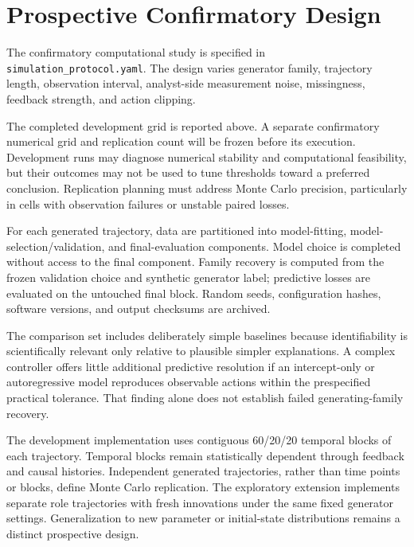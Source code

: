 \section{Prospective Confirmatory Design}

The confirmatory computational study is specified in \texttt{simulation\_protocol.yaml}. The design varies generator family, trajectory length, observation interval, analyst-side measurement noise, missingness, feedback strength, and action clipping.

The completed development grid is reported above. A separate confirmatory numerical grid and replication count will be frozen before its execution. Development runs may diagnose numerical stability and computational feasibility, but their outcomes may not be used to tune thresholds toward a preferred conclusion. Replication planning must address Monte Carlo precision, particularly in cells with observation failures or unstable paired losses.

For each generated trajectory, data are partitioned into model-fitting, model-selection/validation, and final-evaluation components. Model choice is completed without access to the final component. Family recovery is computed from the frozen validation choice and synthetic generator label; predictive losses are evaluated on the untouched final block. Random seeds, configuration hashes, software versions, and output checksums are archived.

The comparison set includes deliberately simple baselines because identifiability is scientifically relevant only relative to plausible simpler explanations. A complex controller offers little additional predictive resolution if an intercept-only or autoregressive model reproduces observable actions within the prespecified practical tolerance. That finding alone does not establish failed generating-family recovery.

The development implementation uses contiguous 60/20/20 temporal blocks of each trajectory. Temporal blocks remain statistically dependent through feedback and causal histories. Independent generated trajectories, rather than time points or blocks, define Monte Carlo replication. The exploratory extension implements separate role trajectories with fresh innovations under the same fixed generator settings. Generalization to new parameter or initial-state distributions remains a distinct prospective design.
